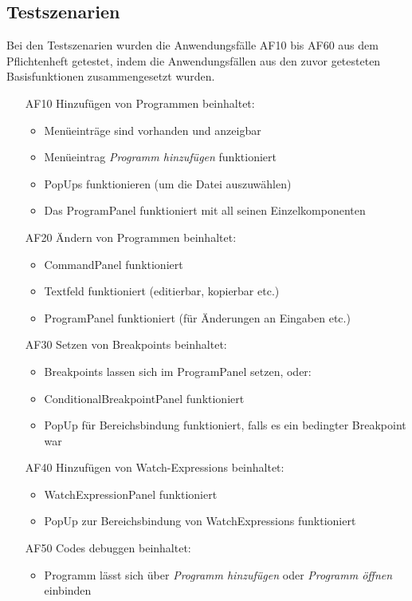 \documentclass[parskip=full]{scrartcl}
\begin{document}
\subsection{Testszenarien}
Bei den Testszenarien wurden die Anwendungsfälle AF10 bis AF60 aus dem Pflichtenheft getestet, indem die Anwendungsfällen aus den zuvor getesteten Basisfunktionen zusammengesetzt wurden.
\begin{itemize} 
	\item[AF10] Hinzufügen von Programmen beinhaltet: 
	\begin{itemize}
		\item Menüeinträge sind vorhanden und anzeigbar
		\item Menüeintrag \textit{Programm hinzufügen} funktioniert
		\item PopUps funktionieren (um die Datei auszuwählen)
		\item Das ProgramPanel funktioniert mit all seinen Einzelkomponenten
	\end{itemize}
	\item[AF20] Ändern von Programmen beinhaltet:
	\begin{itemize}
		\item CommandPanel funktioniert
		\item Textfeld funktioniert (editierbar, kopierbar etc.)
		\item ProgramPanel funktioniert (für Änderungen an Eingaben etc.)
	\end{itemize}
	\item[AF30] Setzen von Breakpoints beinhaltet:
	\begin{itemize}
		\item Breakpoints lassen sich im ProgramPanel setzen, oder:
		\item ConditionalBreakpointPanel funktioniert
		\item PopUp für Bereichsbindung funktioniert, falls es ein bedingter Breakpoint war
	\end{itemize}
	\item[AF40] Hinzufügen von Watch-Expressions beinhaltet:
	\begin{itemize}
		\item WatchExpressionPanel funktioniert
		\item PopUp zur Bereichsbindung von WatchExpressions funktioniert
	\end{itemize}
	\item[AF50] Codes debuggen beinhaltet:
	\begin{itemize}
		\item Programm lässt sich über \textit{Programm hinzufügen} oder \textit{Programm öffnen} einbinden

\end{itemize}
\end{itemize}
\end{document}
